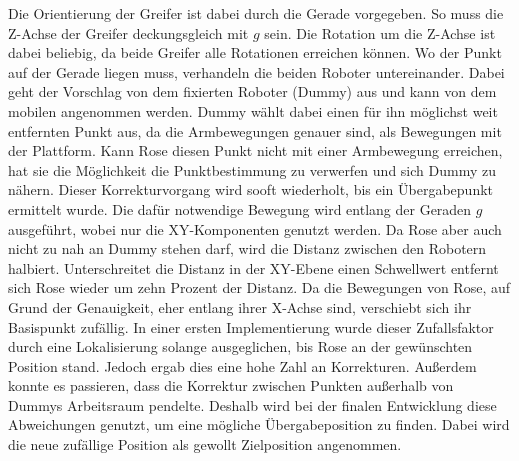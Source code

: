 Die Orientierung der Greifer ist dabei durch die Gerade vorgegeben. So muss die Z-Achse der Greifer deckungsgleich mit $g$ sein. Die Rotation um die Z-Achse ist dabei beliebig, da beide Greifer alle Rotationen erreichen können. Wo der Punkt auf der Gerade liegen muss, verhandeln die beiden Roboter untereinander. Dabei geht der Vorschlag von dem fixierten Roboter (Dummy) aus und kann von dem mobilen angenommen werden. Dummy wählt dabei einen für ihn möglichst weit entfernten Punkt aus, da die Armbewegungen genauer sind, als Bewegungen mit der Plattform. Kann Rose diesen Punkt nicht mit einer Armbewegung erreichen, hat sie die Möglichkeit die Punktbestimmung zu verwerfen und sich Dummy zu nähern.  Dieser Korrekturvorgang wird sooft wiederholt, bis ein Übergabepunkt ermittelt wurde. Die dafür notwendige Bewegung wird entlang der Geraden $g$ ausgeführt, wobei nur die XY-Komponenten genutzt werden. Da Rose aber auch nicht zu nah an Dummy stehen darf, wird die Distanz zwischen den Robotern halbiert. Unterschreitet die Distanz in der XY-Ebene einen Schwellwert entfernt sich Rose wieder um zehn Prozent der Distanz. Da die Bewegungen von Rose, auf Grund der Genauigkeit, eher entlang ihrer X-Achse sind, verschiebt sich ihr Basispunkt zufällig. In einer ersten Implementierung wurde dieser Zufallsfaktor durch eine Lokalisierung solange ausgeglichen, bis Rose an der gewünschten Position stand. Jedoch ergab dies eine hohe Zahl an Korrekturen. Außerdem konnte es passieren, dass die Korrektur zwischen Punkten außerhalb von Dummys Arbeitsraum pendelte. Deshalb wird bei der finalen Entwicklung diese Abweichungen genutzt, um eine mögliche Übergabeposition zu finden. Dabei wird die neue zufällige Position als gewollt Zielposition angenommen.
